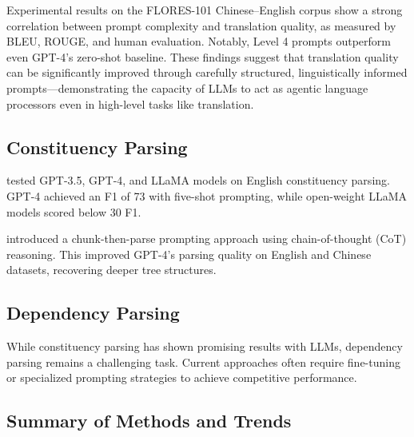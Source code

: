 Experimental results on the FLORES-101 Chinese--English corpus show a strong correlation between prompt complexity and translation quality, as measured by BLEU, ROUGE, and human evaluation. Notably, Level 4 prompts outperform even GPT-4's zero-shot baseline. These findings suggest that translation quality can be significantly improved through carefully structured, linguistically informed prompts—demonstrating the capacity of LLMs to act as agentic language processors even in high-level tasks like translation.

\subsection{Constituency Parsing}

\citet{bai2023llmconst} tested GPT-3.5, GPT-4, and LLaMA models on English constituency parsing. GPT-4 achieved an F1 of 73 with five-shot prompting, while open-weight LLaMA models scored below 30 F1.

\citet{tian2024chunkprompt} introduced a chunk-then-parse prompting approach using chain-of-thought (CoT) reasoning. This improved GPT-4's parsing quality on English and Chinese datasets, recovering deeper tree structures.

\subsection{Dependency Parsing}

While constituency parsing has shown promising results with LLMs, dependency parsing remains a challenging task. Current approaches often require fine-tuning or specialized prompting strategies to achieve competitive performance.

\subsection{Summary of Methods and Trends}

